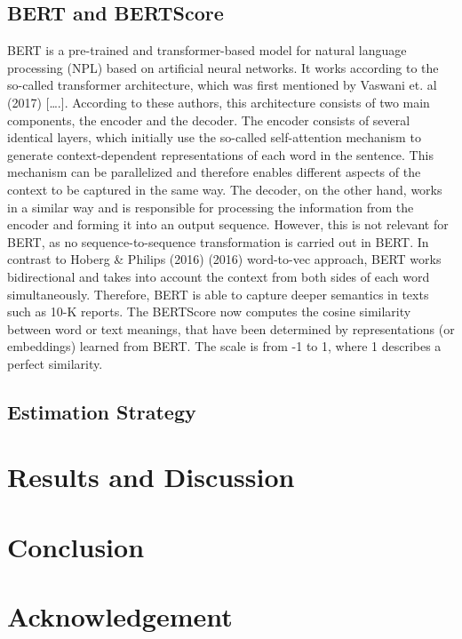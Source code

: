 \documentclass[
]{article}
\begin{document}
\subsection{BERT and BERTScore}\label{bert-and-bertscore}

BERT is a pre-trained and transformer-based model for natural language
processing (NPL) based on artificial neural networks. It works according
to the so-called transformer architecture, which was first mentioned by
Vaswani et. al (2017) {[}\ldots.{]}. According to these authors, this
architecture consists of two main components, the encoder and the
decoder. The encoder consists of several identical layers, which
initially use the so-called self-attention mechanism to generate
context-dependent representations of each word in the sentence. This
mechanism can be parallelized and therefore enables different aspects of
the context to be captured in the same way. The decoder, on the other
hand, works in a similar way and is responsible for processing the
information from the encoder and forming it into an output sequence.
However, this is not relevant for BERT, as no sequence-to-sequence
transformation is carried out in BERT. In contrast to Hoberg \& Philips
(2016) (2016) word-to-vec approach, BERT works bidirectional and takes
into account the context from both sides of each word simultaneously.
Therefore, BERT is able to capture deeper semantics in texts such as
10-K reports. The BERTScore now computes the cosine similarity between
word or text meanings, that have been determined by representations (or
embeddings) learned from BERT. The scale is from -1 to 1, where 1
describes a perfect similarity.

\subsection{Estimation Strategy}\label{estimation-strategy}

\section{Results and Discussion}\label{results-and-discussion}

\section{Conclusion}\label{conclusion}

\section{Acknowledgement}\label{acknowledgement}
\end{document}

